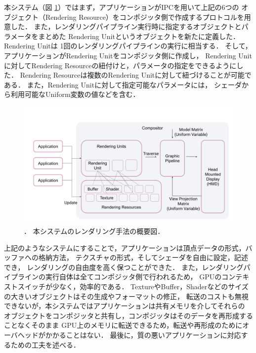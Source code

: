 本システム（図 \ref{fig:rendering}）ではまず，アプリケーションがIPCを用いて上記の6つの
オブジェクト（Rendering Resource）をコンポジッタ側で作成するプロトコルを用意した．
また，レンダリングパイプライン実行時に指定するオブジェクトとパラメータをまとめた
Rendering Unitというオブジェクトを新たに定義した．Rendering Unitは
1回のレンダリングパイプラインの実行に相当する．
そして，アプリケーションがRendering Unitをコンポジッタ側に作成し，
Rendering Unitに対してRendering Resourceの紐付けと，パラメータの指定をできるようにした．
Rendering Resourceは複数のRendering Unitに対して紐づけることが可能である．
また，Rendering Unitに対して指定可能なパラメータには，
シェーダから利用可能なUniform変数の値などを含む．

\begin{figure}[htbp]
  \centering
  \includegraphics[keepaspectratio, width=1\linewidth]{figures/rendering.png}
  \caption{．
    本システムのレンダリング手法の概要図．
  }
  \label{fig:rendering}
\end{figure}

上記のようなシステムにすることで，アプリケーションは頂点データの形式，バッファへの格納方法，
テクスチャの形式，そしてシェーダを自由に設定，記述でき，
レンダリングの自由度を高く保つことができた．
また，レンダリングパイプラインの実行自体は全てコンポジッタ側で行われるため，
GPUのコンテキストスイッチが少なく，効率的である．
TextureやBuffer，Shaderなどのサイズの大きいオブジェクトはその生成やフォーマットの修正，
転送のコストも無視できないが，本システムではアプリケーションは共有メモリを介してそれらの
オブジェクトをコンポジッタと共有し，コンポジッタはそのデータを再形成することなくそのまま
GPU上のメモリに転送できるため，転送や再形成のためにオーバヘッドがかかることはない．
最後に，質の悪いアプリケーションに対応するための工夫を述べる．

